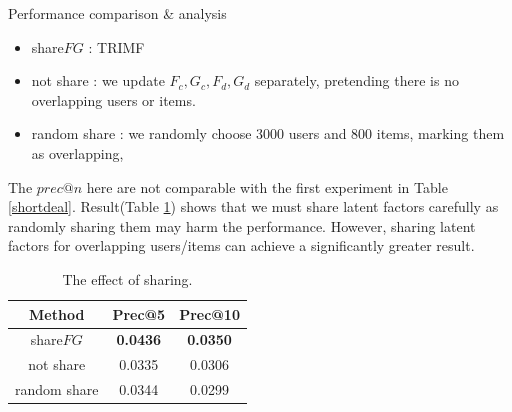 \begin{section}{Performance comparison \& analysis}
    \begin{itemize}
    \item share$FG$ : TRIMF
    \item not share : we update $F_c, G_c, F_d, G_d$ separately, pretending there is no overlapping users or items.
    \item random share : we randomly choose 3000 users and 800 items, marking them as overlapping,
    \end{itemize}
    The $prec@n$ here are not comparable with the first experiment in Table \ref{shortdeal}. Result(Table \ref{sharing}) shows that we must share latent factors carefully as randomly sharing them may harm the performance. However, sharing latent factors for overlapping users/items can achieve a significantly greater result.

    \par{
\begin{table}
\begin{center}
  \begin{tabular}{|c|c|c|}
    \hline
    Method&Prec@5&Prec@10\\
    \hline
    share$FG$&\textbf{\color{red}0.0436}&\textbf{\color{red}0.0350}\\
    \hline
    not share&0.0335&0.0306\\
    \hline
    random share&0.0344&0.0299\\
    \hline
  \end{tabular}
\end{center}
\caption{The effect of sharing.}
\label{sharing}
\end{table}
}
\end{section}

